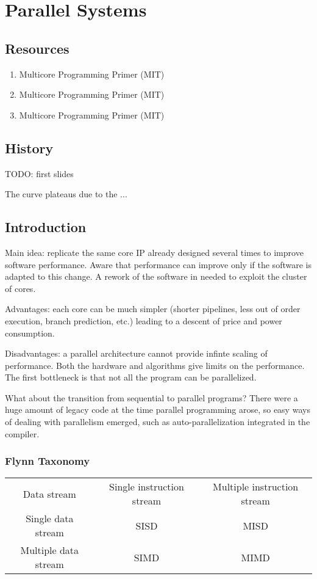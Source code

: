 \chapter{Parallel Systems}

\section{Resources}
\begin{enumerate}
  \item Multicore Programming Primer (MIT)
  \item Multicore Programming Primer (MIT)
  \item Multicore Programming Primer (MIT)
\end{enumerate}

\section{History}
TODO: first slides

The curve plateaus due to the ...


\section{Introduction}
Main idea: replicate the same core IP already designed several times to improve software performance.
Aware that performance can improve only if the software is adapted to this change.
A rework of the software in needed to exploit the cluster of cores.

Advantages: each core can be much simpler (shorter pipelines, less out of order execution, branch prediction, etc.) leading to a descent of price and power consumption.

Disadvantages: a parallel architecture cannot provide infinte scaling of performance. Both the hardware and algorithms give limits on the performance.
The first bottleneck is that not all the program can be parallelized.

What about the transition from sequential to parallel programs?
There were a huge amount of legacy code at the time parallel programming arose, so easy ways of dealing with parallelism emerged, such as auto-parallelization integrated in the compiler.

\subsection{Flynn Taxonomy}
\begin{center}

\begin{tabular}{ |c|c|c| } 
  \hline
  Data stream & Single instruction stream & Multiple instruction stream \\ 
  Single data stream & SISD & MISD \\ 
  Multiple data stream & SIMD & MIMD \\ 
  \hline
\end{tabular}
\end{center}

